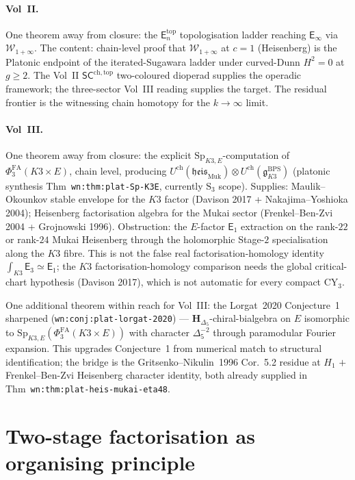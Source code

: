 \documentclass[11pt]{article}
\theoremstyle{definition}
\theoremstyle{remark}
\providecommand{\fg}{\mathfrak{g}}
\providecommand{\fheis}{\mathfrak{heis}}
\providecommand{\Sp}{\mathrm{Sp}}
\providecommand{\Phifa}{\Phi^{\mathrm{FA}}}
\providecommand{\Eone}{\mathsf{E}_1}
\providecommand{\Ethree}{\mathsf{E}_3}
\providecommand{\En}{\mathsf{E}_n}
\providecommand{\Einf}{\mathsf{E}_\infty}
\providecommand{\Winf}{\mathcal{W}_{1+\infty}}
\begin{document}
\paragraph{Vol~II.} One theorem away from closure: the $\En^{\mathrm{top}}$
topologisation ladder reaching $\Einf$ via $\Winf$. The content: chain-level
proof that $\Winf$ at $c = 1$ (Heisenberg) is the Platonic endpoint of the
iterated-Sugawara ladder under curved-Dunn $H^2 = 0$ at $g\geq 2$. The
Vol~II $\mathsf{SC}^{\mathrm{ch,top}}$ two-coloured dioperad supplies
the operadic framework; the three-sector Vol~III reading supplies the
target. The residual frontier is the witnessing chain homotopy for the
$k\to\infty$ limit.

\paragraph{Vol~III.} One theorem away from closure: the explicit
$\Sp_{K3,E}$-computation of $\Phifa_3(K3\times E)$, chain level,
producing $U^{\mathrm{ch}}(\fheis_{\mathrm{Muk}})\otimes
U^{\mathrm{ch}}(\fg^{\mathrm{BPS}}_{K3})$ (platonic synthesis
Thm~\texttt{wn:thm:plat-Sp-K3E}, currently $\mathrm{S}_3$ scope).
Supplies: Maulik--Okounkov stable envelope for the $K3$ factor
(Davison 2017 + Nakajima--Yoshioka 2004); Heisenberg factorisation
algebra for the Mukai sector (Frenkel--Ben-Zvi 2004 + Grojnowski 1996).
Obstruction: the $E$-factor $\Eone$ extraction on the rank-$22$ or
rank-$24$ Mukai Heisenberg through the holomorphic Stage-$2$
specialisation along the $K3$ fibre. This is not the false real
factorisation-homology identity $\int_{K3}\Ethree\simeq\Eone$; the
$K3$ factorisation-homology comparison needs the global critical-chart
hypothesis (Davison 2017), which is not automatic for every compact
CY$_3$.

One additional theorem within reach for Vol~III: the
Lorgat~2020 Conjecture~1 sharpened
(\texttt{wn:conj:plat-lorgat-2020}) ---
$\mathbf{H}_{\Delta_5}$-chiral-bialgebra on $E$ isomorphic to
$\Sp_{K3,E}(\Phifa_3(K3\times E))$ with character $\Delta_5^{-2}$
through paramodular Fourier expansion. This upgrades Conjecture~1
from numerical match to structural identification; the bridge is the
Gritsenko--Nikulin~1996 Cor.~5.2 residue at $H_1$ $+$ Frenkel--Ben-Zvi
Heisenberg character identity, both already supplied in
Thm~\texttt{wn:thm:plat-heis-mukai-eta48}.

\section{Two-stage factorisation as organising principle}
\end{document}
